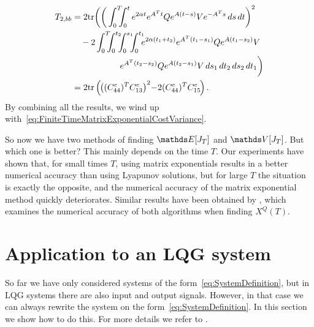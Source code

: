 \documentclass[twocolumn]{autart}
\begin{document}
\begin{pf}
\begin{align}
T_{2,bb} & = 2\tr\bigg(\bigg(\int_0^T \hspace{-6pt} \int_0^t e^{2\alpha t} e^{A^T t} Q e^{A(t-s)} V e^{-A^T s} \, ds \, dt\bigg)^2 \nonumber \\
& \hspace{10pt} - 2\int_0^T \hspace{-6pt} \int_0^{t_2} \hspace{-6pt} \int_0^{s_1} \hspace{-6pt} \int_0^{t_1} \hspace{-6pt} e^{2\alpha(t_1+t_2)} e^{A^T (t_1 - s_1)} Q e^{A (t_1 - s_2)} V \nonumber \\
& \hspace{56pt} e^{A^T (t_2 - s_2)} Q e^{A (t_2 - s_1)} V \, ds_1 \, dt_2 \, ds_2 \, dt_1\bigg) \nonumber \\
& = 2\tr\left(\hspace{-1pt}\left((C_{44}^e)^T C_{13}^e\right)^2 \hspace{-2pt}-\hspace{-2pt} 2 (C_{44}^e)^T C_{15}^e\hspace{-1pt}\right).
\end{align}
By combining all the results, we wind up with~\eqref{eq:FiniteTimeMatrixExponentialCostVariance}.
\end{pf}

So now we have two methods of finding $\ex[J_T]$ and $\va[J_T]$. But which one is better? This mainly depends on the time $T$. Our experiments have shown that, for small times $T$, using matrix exponentials results in a better numerical accuracy than using Lyapunov solutions, but for large $T$ the situation is exactly the opposite, and the numerical accuracy of the matrix exponential method quickly deteriorates. Similar results have been obtained by \cite{LyapunovEquationSolutions}, which examines the numerical accuracy of both algorithms when finding $X^Q(T)$.

\section{Application to an LQG system} \label{s:ApplicationToAnLQGSetUp}

So far we have only considered systems of the form~\eqref{eq:SystemDefinition}, but in LQG systems there are also input and output signals. However, in that case we can always rewrite the system on the form~\eqref{eq:SystemDefinition}. In this section we show how to do this. For more details we refer to \cite{LQBook,MFCBook,DMCSBook,StochasticControlBook}.
\end{document}
